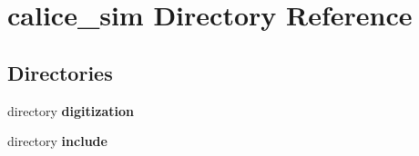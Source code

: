 \section{calice\-\_\-sim Directory Reference}
\label{dir_375b0be0757501a1d21104bad0e61c2c}
\subsection*{Directories}
\begin{DoxyCompactItemize}
\item 
directory {\bf digitization}
\item 
directory {\bf include}
\end{DoxyCompactItemize}
